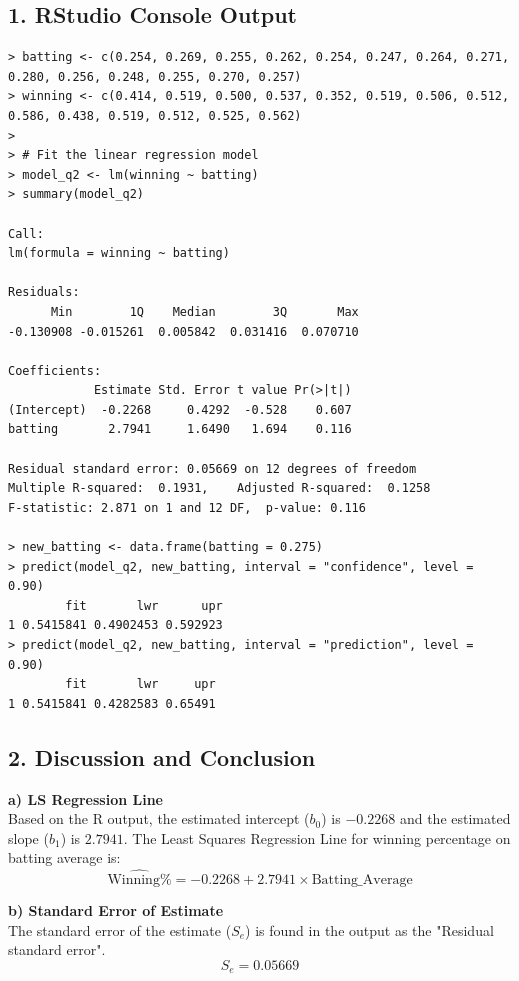 \documentclass[11pt, a4paper]{article}
\begin{document}
\subsection*{1. RStudio Console Output}
\begin{lstlisting}
> batting <- c(0.254, 0.269, 0.255, 0.262, 0.254, 0.247, 0.264, 0.271, 0.280, 0.256, 0.248, 0.255, 0.270, 0.257)
> winning <- c(0.414, 0.519, 0.500, 0.537, 0.352, 0.519, 0.506, 0.512, 0.586, 0.438, 0.519, 0.512, 0.525, 0.562)
> 
> # Fit the linear regression model
> model_q2 <- lm(winning ~ batting)
> summary(model_q2)

Call:
lm(formula = winning ~ batting)

Residuals:
      Min        1Q    Median        3Q       Max 
-0.130908 -0.015261  0.005842  0.031416  0.070710 

Coefficients:
            Estimate Std. Error t value Pr(>|t|)
(Intercept)  -0.2268     0.4292  -0.528    0.607
batting       2.7941     1.6490   1.694    0.116

Residual standard error: 0.05669 on 12 degrees of freedom
Multiple R-squared:  0.1931,	Adjusted R-squared:  0.1258 
F-statistic: 2.871 on 1 and 12 DF,  p-value: 0.116

> new_batting <- data.frame(batting = 0.275)
> predict(model_q2, new_batting, interval = "confidence", level = 0.90)
        fit       lwr      upr
1 0.5415841 0.4902453 0.592923
> predict(model_q2, new_batting, interval = "prediction", level = 0.90)
        fit       lwr     upr
1 0.5415841 0.4282583 0.65491
\end{lstlisting}

\subsection*{2. Discussion and Conclusion}

\textbf{a) LS Regression Line}\\
Based on the R output, the estimated intercept ($b_0$) is $-0.2268$ and the estimated slope ($b_1$) is $2.7941$. The Least Squares Regression Line for winning percentage on batting average is:
\[ \widehat{\text{Winning\%}} = -0.2268 + 2.7941 \times \text{Batting\_Average} \]

\textbf{b) Standard Error of Estimate}\\
The standard error of the estimate ($S_e$) is found in the output as the "Residual standard error".
\[ S_e = 0.05669 \]
\end{document}
